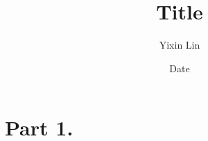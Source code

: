 \documentclass[12pt]{article}
\title{Title}
\date{Date}
\author{Yixin Lin}
\theoremstyle{plain}
\begin{document}
\maketitle
\begin{mdframed}
\tableofcontents
\end{mdframed}
\newpage


\part*{Part 1.}
\end{document}
